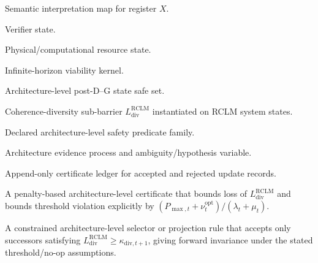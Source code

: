 \documentclass[11pt,a4paper]{article}
\newcommand{\Kcal}{\mathcal K}
\newcommand{\Vcal}{\mathcal V}
\newcommand{\RCLM}{\mathrm{RCLM}}
\newcommand{\DG}{\mathrm{DG}}
\newcommand{\cert}{\mathrm{cert}}
\begin{document}
\begin{description}[leftmargin=2.8cm, style=nextline]
    \item[\(\Gamma_X\)] Semantic interpretation map for register \(X\).
    \item[\(W_t\)] Verifier state.
    \item[\(\mathfrak R_t\)] Physical/computational resource state.
    \item[\(\Vcal_\infty^{\RCLM}\)] Infinite-horizon viability kernel.
    \item[\(\Kcal_{\RCLM,t}^{\DG}\)] Architecture-level post-D--G state safe set.
    \item[\(L_{\mathrm{div}}\)] Coherence-diversity sub-barrier \(L_{\mathrm{div}}^{\RCLM}\) instantiated on RCLM system states.
    \item[\(\mathfrak S_t^{\RCLM}\)] Declared architecture-level safety predicate family.
    \item[\(E_t^{\RCLM},Q_t^{\RCLM}\)] Architecture evidence process and ambiguity/hypothesis variable.
    \item[\(\mathcal H_t^{\cert}\)] Append-only certificate ledger for accepted and rejected update records.
    \item[Soft diversity-barrier certificate] A penalty-based architecture-level certificate that bounds loss of \(L_{\mathrm{div}}^{\RCLM}\) and bounds threshold violation explicitly by \((P_{\max,t}+\nu_t^{\mathrm{opt}})/(\lambda_t+\mu_t)\).
    \item[Hard diversity-barrier certificate] A constrained architecture-level selector or projection rule that accepts only successors satisfying \(L_{\mathrm{div}}^{\RCLM}\ge\kappa_{\mathrm{div},t+1}\), giving forward invariance under the stated threshold/no-op assumptions.


\end{description}
\end{document}
